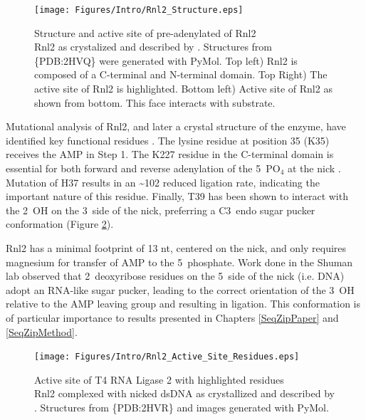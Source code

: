     \begin{figure} %
      \centering 
      \texttt{[image: Figures/Intro/Rnl2\_Structure.eps]}
      \caption[Structure and active site of pre-adenylated Rnl2]
      {
        Structure and active site of pre-adenylated of Rnl2\\[0.25cm]
        Rnl2 as crystalized and described by \citep{Nandakumar2006}. Structures from \{PDB:2HVQ\} were generated with PyMol. Top left) Rnl2 is composed of a C-terminal and N-terminal domain. Top Right) The active site of Rnl2 is highlighted. Bottom left) Active site of Rnl2 as shown from bottom. This face interacts with substrate.
        }
      \label{Intro:fig:Rnl2 General Structure}
      \end{figure}

    Mutational analysis of Rnl2, and later a crystal structure of the enzyme, have identified key functional residues \citep{Ho2004, Nandakumar2006,Nandakumar2004a,Yin2003d}. The lysine residue at position 35 (K35) receives the AMP in Step 1. The K227 residue in the C-terminal domain is essential for both forward and reverse adenylation of the 5\textprime~PO$_4$ at the nick \citep{Viollet2011}. Mutation of H37 results in an \textasciitilde102 reduced ligation rate, indicating the important nature of this residue. Finally, T39 has been shown to interact with the 2\textprime~OH on the 3\textprime~side of the nick, preferring a C3\textprime~endo sugar pucker conformation (Figure \ref{Intro:fig:Rnl2 Active Site Residues}).

    Rnl2 has a minimal footprint of 13 nt, centered on the nick, and only requires magnesium for transfer of AMP to the 5\textprime~phosphate. Work done in the Shuman lab \citep{Nandakumar2006} observed that 2\textprime~deoxyribose residues on the 5\textprime~side of the nick (i.e. DNA) adopt an RNA-like sugar pucker, leading to the correct orientation of the 3\textprime~OH relative to the AMP leaving group and resulting in ligation. This conformation is of particular importance to results presented in Chapters \ref{SeqZipPaper} and \ref{SeqZipMethod}.

    \begin{figure} %
      \centering 
      \texttt{[image: Figures/Intro/Rnl2\_Active\_Site\_Residues.eps]}
      \caption[Active site of T4 RNA Ligase 2 with highlighted residues]
      {
        Active site of T4 RNA Ligase 2 with highlighted residues\\[0.25cm]
        Rnl2 complexed with nicked dsDNA as crystallized and described by \citep{Nandakumar2006}. Structures from \{PDB:2HVR\} and images generated with PyMol.
        }
      \label{Intro:fig:Rnl2 Active Site Residues}
      \end{figure}

